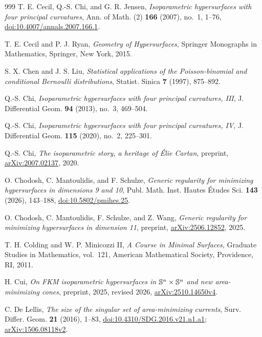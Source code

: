 \begin{thebibliography}{999}
T. E. Cecil, Q.-S. Chi, and G. R. Jensen,
\emph{Isoparametric hypersurfaces with four principal curvatures},
Ann. of Math. (2) \textbf{166} (2007), no.~1, 1--76,
\href{https://doi.org/10.4007/annals.2007.166.1}{doi:10.4007/annals.2007.166.1}.

T. E. Cecil and P. J. Ryan,
\emph{Geometry of Hypersurfaces},
Springer Monographs in Mathematics, Springer, New York, 2015.

S. X. Chen and J. S. Liu,
\emph{Statistical applications of the Poisson-binomial and conditional
Bernoulli distributions}, Statist. Sinica \textbf{7} (1997), 875--892.

Q.-S. Chi,
\emph{Isoparametric hypersurfaces with four principal curvatures, III},
J. Differential Geom. \textbf{94} (2013), no.~3, 469--504.

Q.-S. Chi,
\emph{Isoparametric hypersurfaces with four principal curvatures, IV},
J. Differential Geom. \textbf{115} (2020), no.~2, 225--301.

Q.-S. Chi,
\emph{The isoparametric story, a heritage of \'Elie Cartan},
preprint, \href{https://arxiv.org/abs/2007.02137}{arXiv:2007.02137}, 2020.

O. Chodosh, C. Mantoulidis, and F. Schulze,
\emph{Generic regularity for minimizing hypersurfaces in dimensions 9 and 10},
Publ. Math. Inst. Hautes \'Etudes Sci. \textbf{143} (2026), 143--188,
\href{https://doi.org/10.5802/pmihes.25}{doi:10.5802/pmihes.25}.

O. Chodosh, C. Mantoulidis, F. Schulze, and Z. Wang,
\emph{Generic regularity for minimizing hypersurfaces in dimension 11},
preprint, \href{https://arxiv.org/abs/2506.12852}{arXiv:2506.12852}, 2025.

T. H. Colding and W. P. Minicozzi II,
\emph{A Course in Minimal Surfaces},
Graduate Studies in Mathematics, vol.~121,
American Mathematical Society, Providence, RI, 2011.

H. Cui,
\emph{On FKM isoparametric hypersurfaces in
\(\mathbb S^n\times\mathbb S^n\) and new area-minimizing cones},
preprint, 2025, revised 2026,
\href{https://arxiv.org/abs/2510.14650v4}{arXiv:2510.14650v4}.

C. De Lellis,
\emph{The size of the singular set of area-minimizing currents},
Surv. Differ. Geom. \textbf{21} (2016), 1--83,
\href{https://doi.org/10.4310/SDG.2016.v21.n1.a1}{doi:10.4310/SDG.2016.v21.n1.a1};
\href{https://arxiv.org/abs/1506.08118v2}{arXiv:1506.08118v2}.


\end{thebibliography}
